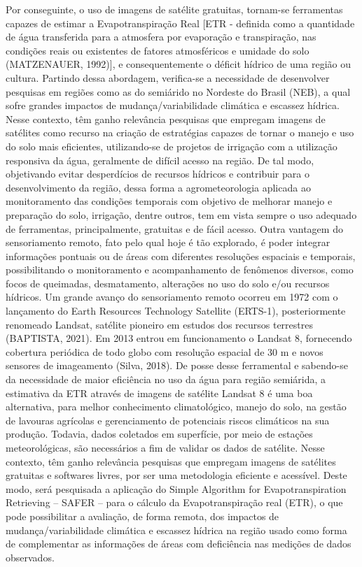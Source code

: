 \documentclass[fleqn]{icat-ufal}
\begin{document}
Por conseguinte, o uso de imagens de satélite gratuitas, tornam-se ferramentas capazes de estimar a Evapotranspiração Real [ETR -  definida como a quantidade de água transferida para a atmosfera por evaporação e transpiração, nas condições reais ou existentes de fatores atmosféricos e umidade do solo (MATZENAUER, 1992)], e consequentemente o déficit hídrico de uma região ou cultura. Partindo dessa abordagem,  verifica-se a necessidade de desenvolver pesquisas em regiões como as do semiárido no Nordeste do Brasil (NEB), a qual sofre grandes impactos de mudança/variabilidade climática e escassez hídrica. 
Nesse contexto, têm ganho relevância pesquisas que empregam imagens de satélites como recurso na criação de estratégias capazes de tornar o manejo e uso do solo mais eficientes, utilizando-se de projetos de irrigação com a utilização responsiva da água, geralmente de difícil acesso na região. De tal modo, objetivando evitar desperdícios de recursos hídricos e contribuir para o desenvolvimento da região, dessa forma a agrometeorologia aplicada ao monitoramento das condições temporais com objetivo de melhorar manejo e preparação do solo, irrigação, dentre outros, tem em vista sempre o uso adequado de ferramentas, principalmente, gratuitas e de fácil acesso.
Outra vantagem do sensoriamento remoto, fato pelo qual hoje é tão explorado, é poder integrar informações pontuais ou de áreas com diferentes resoluções espaciais e temporais, possibilitando o monitoramento e acompanhamento de fenômenos diversos, como focos de queimadas, desmatamento, alterações no uso do solo e/ou recursos hídricos. 
Um grande avanço do sensoriamento remoto ocorreu em 1972 com o lançamento do Earth Resources Technology Satellite (ERTS-1), posteriormente renomeado Landsat, satélite pioneiro em estudos dos recursos terrestres (BAPTISTA, 2021). Em 2013 entrou em funcionamento o Landsat 8, fornecendo cobertura periódica de todo globo com resolução espacial de 30 m e novos sensores de imageamento (Silva, 2018).
De posse desse ferramental e sabendo-se da necessidade de maior eficiência no uso da água para região semiárida, a estimativa da ETR através de imagens de satélite Landsat 8 é uma boa alternativa, para melhor conhecimento climatológico, manejo do solo, na gestão de lavouras agrícolas e gerenciamento de potenciais riscos climáticos na sua produção. Todavia, dados coletados em superfície, por meio de estações meteorológicas, são necessários a fim de validar os dados de satélite. 
Nesse contexto, têm ganho relevância pesquisas que empregam imagens de satélites gratuitas e softwares livres, por ser uma metodologia eficiente e acessível.  Deste modo, será pesquisada a aplicação do Simple Algorithm for Evapotranspiration Retrieving – SAFER – para o cálculo da Evapotranspiração real (ETR), o que pode possibilitar a avaliação, de forma remota, dos impactos de mudança/variabilidade climática e escassez hídrica na região  usado como forma de complementar as informações de áreas com deficiência nas medições de dados observados.
\end{document}
